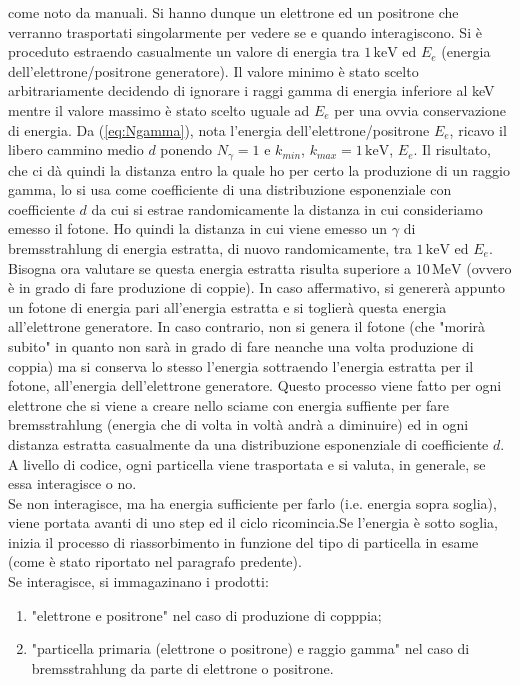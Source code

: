 \documentclass[10pt,a4paper,usenatbib]{article}
\newcommand*{\unit}[1]{\ensuremath{\mathrm{\,#1}}}                              %
\begin{document}
come noto da manuali. Si hanno dunque un elettrone ed un positrone che verranno trasportati singolarmente per vedere se e quando interagiscono. Si è proceduto estraendo casualmente un valore di energia tra $1 \unit{keV}$ ed $E_e$ (energia dell'elettrone/positrone generatore). Il valore minimo è stato scelto arbitrariamente decidendo di ignorare i raggi gamma di energia inferiore al keV mentre il valore massimo è stato scelto uguale ad $E_e$ per una ovvia conservazione di energia. Da (\ref{eq:Ngamma}), nota l'energia dell'elettrone/positrone $E_e$, ricavo il libero cammino medio $d$ ponendo $N_\gamma = 1$ e $k_{min}$, $k_{max} = 1 \unit{keV}$, $E_e$. Il risultato, che ci dà quindi la distanza entro la quale ho per certo la produzione di un raggio gamma, lo si usa come coefficiente di una distribuzione esponenziale con coefficiente $d$ da cui si estrae randomicamente la distanza in cui consideriamo emesso il fotone. Ho quindi la distanza in cui viene emesso un $\gamma$ di bremsstrahlung di energia estratta, di nuovo randomicamente, tra $1\unit{keV}$ ed $E_e$. Bisogna ora valutare se questa energia estratta risulta superiore a $10\unit{MeV}$ (ovvero è in grado di fare produzione di coppie). In caso affermativo, si genererà appunto un fotone di energia pari all'energia estratta e si toglierà questa energia all'elettrone generatore. In caso contrario, non si genera il fotone (che "morirà subito" in quanto non sarà in grado di fare neanche una volta produzione di coppia) ma si conserva lo stesso l'energia sottraendo l'energia estratta per il fotone, all'energia dell'elettrone generatore. Questo processo viene fatto per ogni elettrone che si viene a creare nello sciame con energia suffiente per fare bremsstrahlung (energia che di volta in voltà andrà a diminuire) ed in ogni distanza estratta casualmente da una distribuzione esponenziale di coefficiente $d$. 
\\A livello di codice, ogni particella viene trasportata e si valuta, in generale, se essa interagisce o no. 
\\Se non interagisce, ma ha energia sufficiente per farlo (i.e. energia sopra soglia), viene portata avanti di uno step ed il ciclo ricomincia.Se l'energia è sotto soglia, inizia il processo di riassorbimento in funzione del tipo di particella in esame (come è stato riportato nel paragrafo predente). 
\\Se interagisce, si immagazinano i prodotti: 
\begin{enumerate}
\item "elettrone e positrone" nel caso di produzione di copppia; 
\item "particella primaria (elettrone o positrone) e raggio gamma" nel caso di bremsstrahlung da parte di elettrone o positrone.
\end{enumerate}
\end{document}
